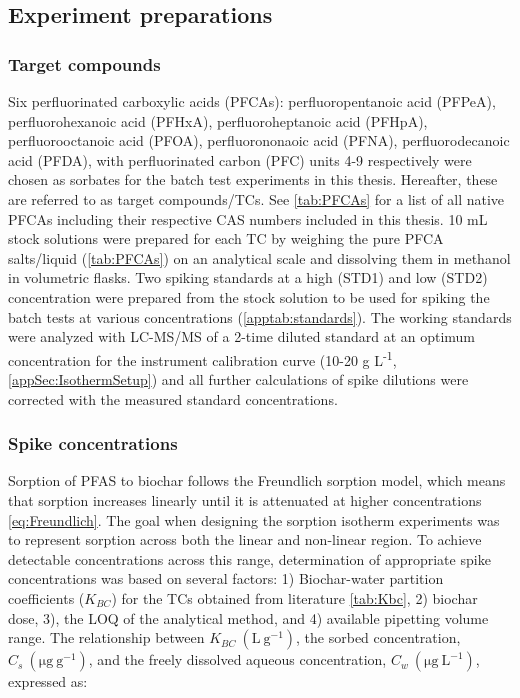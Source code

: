 \subsection{Experiment preparations}
\subsubsection{Target compounds}\label{sec:PFCAanalytic}
Six perfluorinated carboxylic acids (PFCAs): perfluoropentanoic acid (PFPeA), perfluorohexanoic acid (PFHxA), perfluoroheptanoic acid (PFHpA), perfluorooctanoic acid (PFOA), perfluorononaoic acid (PFNA), perfluorodecanoic acid (PFDA), with perfluorinated carbon (PFC) units 4-9 respectively were chosen as sorbates for the batch test experiments in this thesis. Hereafter, these are referred to as target compounds/TCs. See \cref{tab:PFCAs} for a list of all native PFCAs including their respective CAS numbers included in this thesis. 10 mL stock solutions were prepared for each TC by weighing the pure PFCA salts/liquid (\cref{tab:PFCAs}) on an analytical scale and dissolving them in methanol in volumetric flasks. Two spiking standards at a high (STD1) and low (STD2) concentration were prepared from the stock solution to be used for spiking the batch tests at various concentrations (\cref{apptab:standards}). The working standards were analyzed with LC-MS/MS of a 2-time diluted standard at an optimum concentration for the instrument calibration curve (10-20 \textmu g L\textsuperscript{-1}, \cref{appSec:IsothermSetup}) and all further calculations of spike dilutions were corrected with the measured standard concentrations.



\subsubsection{Spike concentrations}
Sorption of PFAS to biochar follows the Freundlich sorption model, which means that sorption increases linearly until it is attenuated at higher concentrations \cref{eq:Freundlich}. The goal when designing the sorption isotherm experiments was to represent sorption across both the linear and non-linear region. To achieve detectable concentrations across this range, determination of appropriate spike concentrations was based on several factors: 1) Biochar-water partition coefficients ($K_{BC}$) for the TCs obtained from literature \cite{Xiao2017} \cref{tab:Kbc}, 2) biochar dose, 3), the LOQ of the analytical method, and 4) available pipetting volume range. The relationship between $K_{BC}~\mathrm{(L~g^{-1})}$, the sorbed concentration, $C_s~\mathrm{(\mu g~g^{-1})}$, and the freely dissolved aqueous concentration, $C_w~\mathrm{(\mu g~L^{-1})}$, expressed as:

